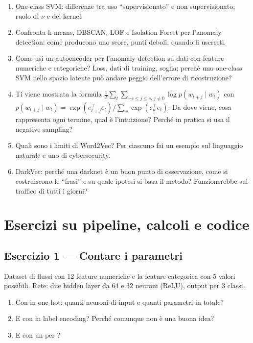 \begin{enumerate}[label=\textbf{A\arabic*.},ref=A\arabic*,leftmargin=2.6em,itemsep=6pt]
  \item\label{es:a14} One-class SVM: differenze tra uso ``supervisionato'' e non supervisionato; ruolo di $\nu$ e del kernel.
  \item\label{es:a15} Confronta k-means, DBSCAN, LOF e Isolation Forest per l'anomaly detection: come producono uno score, punti deboli, quando li useresti.
  \item\label{es:a16} Come usi un autoencoder per l'anomaly detection su dati con feature numeriche e categoriche? Loss, dati di training, soglia; perché una one-class SVM nello spazio latente può andare peggio dell'errore di ricostruzione?
  \item\label{es:a17} Ti viene mostrata la formula $\frac{1}{T}\sum_{t}\sum_{-c\le j\le c,\, j\ne 0}\log p(w_{t+j}\mid w_t)$ con $p(w_{t+j}\mid w_t) = \exp(e_{t+j}^{\top}e_t)/\sum_{w}\exp(e_w^{\top}e_t)$. Da dove viene, cosa rappresenta ogni termine, qual è l'intuizione? Perché in pratica si usa il negative sampling?
  \item\label{es:a18} Quali sono i limiti di Word2Vec? Per ciascuno fai un esempio sul linguaggio naturale e uno di cybersecurity.
  \item\label{es:a19} DarkVec: perché una darknet è un buon punto di osservazione, come si costruiscono le ``frasi'' e su quale ipotesi si basa il metodo? Funzionerebbe sul traffico di tutti i giorni?
\end{enumerate}

\section{Esercizi su pipeline, calcoli e codice}

\subsection*{Esercizio 1 --- Contare i parametri}\label{es:e1}
Dataset di flussi con 12 feature numeriche e la feature categorica  con 5 valori possibili. Rete: due hidden layer
da 64 e 32 neuroni (ReLU), output per 3 classi.
\begin{enumerate}[label=(\alph*)]
  \item Con  in one-hot: quanti neuroni di input e quanti parametri in totale?
  \item E con  in label encoding? Perché comunque non è una buona idea?
  \item E con un  per ?
\end{enumerate}

